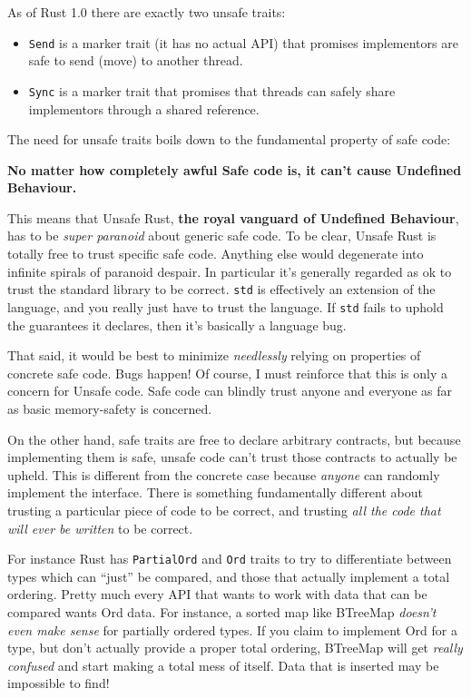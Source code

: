\documentclass[a4paper,]{book}
\providecommand{\tightlist}{%
  \setlength{\itemsep}{0pt}\setlength{\parskip}{0pt}}
\begin{document}
As of Rust 1.0 there are exactly two unsafe traits:

\begin{itemize}
\tightlist
\item
  \texttt{Send} is a marker trait (it has no actual API) that promises
  implementors are safe to send (move) to another thread.
\item
  \texttt{Sync} is a marker trait that promises that threads can safely
  share implementors through a shared reference.
\end{itemize}

The need for unsafe traits boils down to the fundamental property of
safe code:

\textbf{No matter how completely awful Safe code is, it can't cause
Undefined Behaviour.}

This means that Unsafe Rust, \textbf{the royal vanguard of Undefined
Behaviour}, has to be \emph{super paranoid} about generic safe code. To
be clear, Unsafe Rust is totally free to trust specific safe code.
Anything else would degenerate into infinite spirals of paranoid
despair. In particular it's generally regarded as ok to trust the
standard library to be correct. \texttt{std} is effectively an extension
of the language, and you really just have to trust the language. If
\texttt{std} fails to uphold the guarantees it declares, then it's
basically a language bug.

That said, it would be best to minimize \emph{needlessly} relying on
properties of concrete safe code. Bugs happen! Of course, I must
reinforce that this is only a concern for Unsafe code. Safe code can
blindly trust anyone and everyone as far as basic memory-safety is
concerned.

On the other hand, safe traits are free to declare arbitrary contracts,
but because implementing them is safe, unsafe code can't trust those
contracts to actually be upheld. This is different from the concrete
case because \emph{anyone} can randomly implement the interface. There
is something fundamentally different about trusting a particular piece
of code to be correct, and trusting \emph{all the code that will ever be
written} to be correct.

For instance Rust has \texttt{PartialOrd} and \texttt{Ord} traits to try
to differentiate between types which can ``just'' be compared, and those
that actually implement a total ordering. Pretty much every API that
wants to work with data that can be compared wants Ord data. For
instance, a sorted map like BTreeMap \emph{doesn't even make sense} for
partially ordered types. If you claim to implement Ord for a type, but
don't actually provide a proper total ordering, BTreeMap will get
\emph{really confused} and start making a total mess of itself. Data
that is inserted may be impossible to find!
\end{document}
